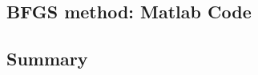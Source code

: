\documentclass[xcolor=dvipsnames,11pt]{beamer}
\begin{document}

\subsection{BFGS method: Matlab Code}

%	
%	
%	
%	
%	
%	
%	




\begin{frame}
\frametitle{\subsecname}
\vspace{-3pt}	

\end{frame}



\begin{frame}
\frametitle{\subsecname}
\vspace{-3pt}	

\end{frame}



\begin{frame}
\frametitle{\subsecname}
\vspace{-3pt}	

\end{frame}


\subsection{Summary}
\end{document}
